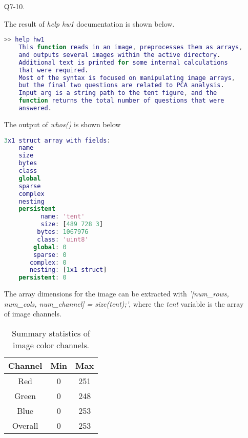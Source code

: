 \documentclass[12pt]{report}
\begin{document}
\begin{enumerate}

    \item[Q7-10.]

    The result of \emph{help hw1} documentation is shown below.
    \begin{lstlisting}[language=Matlab]
    >> help hw1
    This function reads in an image, preprocesses them as arrays, 
    and outputs several images within the active directory. 
    Additional text is printed for some internal calculations 
    that were required. 
    Most of the syntax is focused on manipulating image arrays, 
    but the final two questions are related to PCA analysis.
    Input arg is a string path to the tent figure, and the 
    function returns the total number of questions that were 
    answered.
    \end{lstlisting}

    The output of \emph{whos()} is shown below 
    \begin{lstlisting}[language=Matlab]
    3x1 struct array with fields:
    name
    size
    bytes
    class
    global
    sparse
    complex
    nesting
    persistent
          name: 'tent'
          size: [489 728 3]
         bytes: 1067976
         class: 'uint8'
        global: 0
        sparse: 0
       complex: 0
       nesting: [1x1 struct]
    persistent: 0
    \end{lstlisting}

    The array dimensions for the image can be extracted with \emph{'[num\_rows, num\_cols, 
    num\_channel] = size(tent);'}, where the \emph{tent} variable is the array of image channels.
    
    \begin{table}[h!]
    \begin{center}
    \begin{tabular}{ ||c c c|| } 
        \hline
        Channel & Min & Max \\ 
        \hline \hline
        Red & 0 & 251 \\ 
        Green & 0 & 248 \\ 
        Blue & 0 & 253 \\ 
        Overall & 0 & 253 \\ 
        \hline
    \end{tabular}
    \caption{Summary statistics of image color channels.}
    \label{tab:Table1}
    \end{center}
    \end{table}


\end{enumerate}
\end{document}
